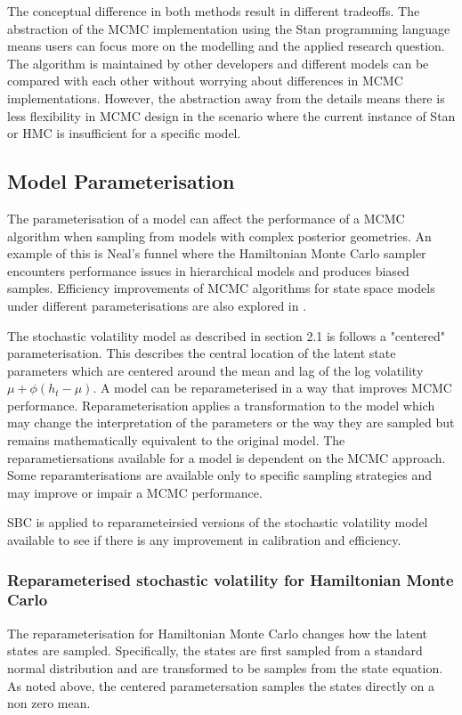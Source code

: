 \documentclass[12pt, a4paper]{article}
\begin{document}
        The conceptual difference in both methods result in different tradeoffs. The abstraction of the MCMC implementation using the Stan programming language means users can focus more on the modelling and the applied research question. The algorithm is maintained by other developers and different models can be compared with each other without worrying about differences in MCMC implementations. However, the abstraction away from the details means there is less flexibility in MCMC design in the scenario where the current instance of Stan or HMC is insufficient for a specific model.
        
    \subsection{Model Parameterisation}

        The parameterisation of a model can affect the performance of a MCMC algorithm when sampling from models with complex posterior geometries. An example of this is Neal's funnel \citep{neal2003slice} where the Hamiltonian Monte Carlo sampler encounters performance issues in hierarchical models and produces biased samples. Efficiency improvements of MCMC algorithms for state space models under different parameterisations are also explored in \citet{strickland2008parameterisation}.

        The stochastic volatility model as described in section 2.1 is follows a "centered" parameterisation. This describes the central location of the latent state parameters which are centered around the mean and lag of the log volatility $\mu +\phi(h_t - \mu)$. A model can be reparameterised in a way that improves MCMC performance. Reparameterisation applies a transformation to the model which may change the interpretation of the parameters or the way they are sampled but remains mathematically equivalent to the original model. The reparametiersations available for a model is dependent on the MCMC approach. Some reparamterisations are available only to specific sampling strategies and may improve or impair a MCMC performance. 

        SBC is applied to reparameteirsied versions of the stochastic volatility model available to see if there is any improvement in calibration and efficiency. 
        
        \subsubsection{Reparameterised stochastic volatility for Hamiltonian Monte Carlo}
        The reparameterisation for Hamiltonian Monte Carlo changes how the latent states are sampled. Specifically, the states are first sampled from a standard normal distribution and are transformed to be samples from the state equation. As noted above, the centered parametersation samples the states directly on a non zero mean. 
\end{document}
